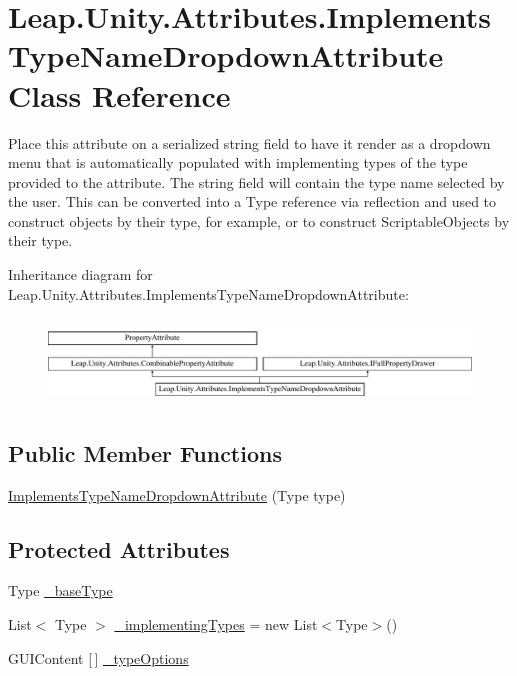 \hypertarget{class_leap_1_1_unity_1_1_attributes_1_1_implements_type_name_dropdown_attribute}{}\section{Leap.\+Unity.\+Attributes.\+Implements\+Type\+Name\+Dropdown\+Attribute Class Reference}
\label{class_leap_1_1_unity_1_1_attributes_1_1_implements_type_name_dropdown_attribute}


Place this attribute on a serialized string field to have it render as a dropdown menu that is automatically populated with implementing types of the type provided to the attribute. The string field will contain the type name selected by the user. This can be converted into a Type reference via reflection and used to construct objects by their type, for example, or to construct Scriptable\+Objects by their type.  


Inheritance diagram for Leap.\+Unity.\+Attributes.\+Implements\+Type\+Name\+Dropdown\+Attribute\+:\begin{figure}[H]
\begin{center}
\leavevmode
\includegraphics[height=2.288828cm]{class_leap_1_1_unity_1_1_attributes_1_1_implements_type_name_dropdown_attribute}
\end{center}
\end{figure}
\subsection*{Public Member Functions}
\begin{DoxyCompactItemize}
\item 
\mbox{\hyperlink{class_leap_1_1_unity_1_1_attributes_1_1_implements_type_name_dropdown_attribute_abe2b9c79628fd26a6a0eeb45b24db341}{Implements\+Type\+Name\+Dropdown\+Attribute}} (Type type)
\end{DoxyCompactItemize}
\subsection*{Protected Attributes}
\begin{DoxyCompactItemize}
\item 
Type \mbox{\hyperlink{class_leap_1_1_unity_1_1_attributes_1_1_implements_type_name_dropdown_attribute_a1422871ce34b7edd2eb4344db5fd18a5}{\+\_\+base\+Type}}
\item 
List$<$ Type $>$ \mbox{\hyperlink{class_leap_1_1_unity_1_1_attributes_1_1_implements_type_name_dropdown_attribute_aca88af771913c3f00a5733bac32bd2b9}{\+\_\+implementing\+Types}} = new List$<$Type$>$()
\item 
G\+U\+I\+Content \mbox{[}$\,$\mbox{]} \mbox{\hyperlink{class_leap_1_1_unity_1_1_attributes_1_1_implements_type_name_dropdown_attribute_ae51a3dabf9bf7ec098a2ccf47cdd8106}{\+\_\+type\+Options}}
\end{DoxyCompactItemize}
